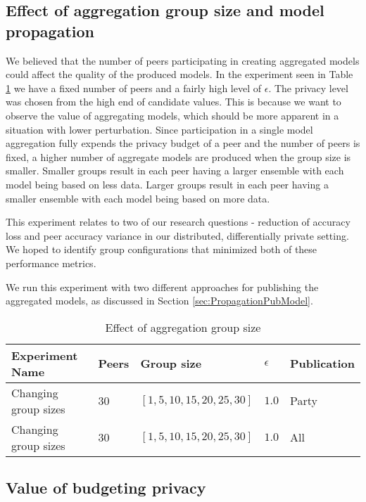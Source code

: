 \subsection{Effect of aggregation group size and model propagation}

We believed that the number of peers participating in creating aggregated models could affect the quality of the produced models. In the experiment seen in Table \ref{tab:experiments_group_sizes} we have a fixed number of peers and a fairly high level of $\epsilon$. The privacy level was chosen from the high end of candidate values. This is because we want to observe the value of aggregating models, which should be more apparent in a situation with lower perturbation. Since participation in a single model aggregation fully expends the privacy budget of a peer and the number of peers is fixed, a higher number of aggregate models are produced when the group size is smaller. Smaller groups result in each peer having a larger ensemble with each model being based on less data. Larger groups result in each peer having a smaller ensemble with each model being based on more data.

This experiment relates to two of our research questions - reduction of accuracy loss and peer accuracy variance in our distributed, differentially private setting. We hoped to identify group configurations that minimized both of these performance metrics.

We run this experiment with two different approaches for publishing the aggregated models, as discussed in Section \ref{sec:PropagationPubModel}.

\begin{table}[h]
	\centering
	\begin{tabular}{|l|l|l|l|l|}
		{\bf Experiment Name} & {\bf Peers} & {\bf Group size} & $\epsilon$ & {\bf Publication} \\
		\hline
		Changing group sizes  & 30          & $[1, 5, 10, 15, 20, 25, 30]$      &     $1.0$ & Party     \\ 
		Changing group sizes  & 30          & $[1, 5, 10, 15, 20, 25, 30]$      &     $1.0$ & All     \\ 
	\end{tabular}
	\caption{Effect of aggregation group size}
	\label{tab:experiments_group_sizes}
\end{table}


\subsection{Value of budgeting privacy}
 
